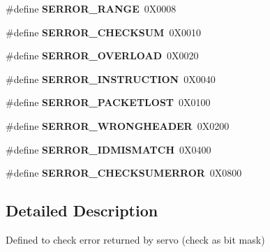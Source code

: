 \begin{DoxyCompactItemize}
\item 
\#define {\bfseries S\+E\+R\+R\+O\+R\+\_\+\+R\+A\+N\+GE}~0\+X0008\hypertarget{group__SERROR__GROUP_ga184fdfdf55d5b831be9de9b2152e361a}{}\label{group__SERROR__GROUP_ga184fdfdf55d5b831be9de9b2152e361a}

\item 
\#define {\bfseries S\+E\+R\+R\+O\+R\+\_\+\+C\+H\+E\+C\+K\+S\+UM}~0\+X0010\hypertarget{group__SERROR__GROUP_gaecd0ee5ce7e0c2d07fc401787f0a3cd9}{}\label{group__SERROR__GROUP_gaecd0ee5ce7e0c2d07fc401787f0a3cd9}

\item 
\#define {\bfseries S\+E\+R\+R\+O\+R\+\_\+\+O\+V\+E\+R\+L\+O\+AD}~0\+X0020\hypertarget{group__SERROR__GROUP_ga0c3768bf7aeb7a4264819e5f54ce6f8c}{}\label{group__SERROR__GROUP_ga0c3768bf7aeb7a4264819e5f54ce6f8c}

\item 
\#define {\bfseries S\+E\+R\+R\+O\+R\+\_\+\+I\+N\+S\+T\+R\+U\+C\+T\+I\+ON}~0\+X0040\hypertarget{group__SERROR__GROUP_ga700b18e096ad99114131499058311fbf}{}\label{group__SERROR__GROUP_ga700b18e096ad99114131499058311fbf}

\item 
\#define {\bfseries S\+E\+R\+R\+O\+R\+\_\+\+P\+A\+C\+K\+E\+T\+L\+O\+ST}~0\+X0100\hypertarget{group__SERROR__GROUP_ga44f9f0354cf660b3e0af565d8358aa5d}{}\label{group__SERROR__GROUP_ga44f9f0354cf660b3e0af565d8358aa5d}

\item 
\#define {\bfseries S\+E\+R\+R\+O\+R\+\_\+\+W\+R\+O\+N\+G\+H\+E\+A\+D\+ER}~0\+X0200\hypertarget{group__SERROR__GROUP_ga2453d13a9841c9589382458b494571b6}{}\label{group__SERROR__GROUP_ga2453d13a9841c9589382458b494571b6}

\item 
\#define {\bfseries S\+E\+R\+R\+O\+R\+\_\+\+I\+D\+M\+I\+S\+M\+A\+T\+CH}~0\+X0400\hypertarget{group__SERROR__GROUP_ga08115676708915dd4be9d0cad1923c5d}{}\label{group__SERROR__GROUP_ga08115676708915dd4be9d0cad1923c5d}

\item 
\#define {\bfseries S\+E\+R\+R\+O\+R\+\_\+\+C\+H\+E\+C\+K\+S\+U\+M\+E\+R\+R\+OR}~0\+X0800\hypertarget{group__SERROR__GROUP_ga82069719a95b7b7dadf7a5590c35fdc4}{}\label{group__SERROR__GROUP_ga82069719a95b7b7dadf7a5590c35fdc4}

\end{DoxyCompactItemize}


\subsection{Detailed Description}
Defined to check error returned by servo (check as bit mask) 